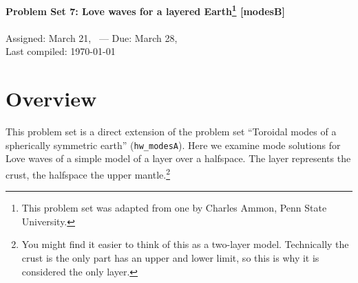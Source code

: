 \documentclass[11pt,titlepage,fleqn]{article}
\begin{document}

\begin{spacing}{1.2}
\centering
{\large \bf Problem Set 7: Love waves for a layered Earth\footnote{This problem set was adapted from one by Charles Ammon, Penn State University.} [modesB]} \\
\cltag\ \\
Assigned: March 21, \cyear\ --- Due: March 28, \cyear\ \\
Last compiled: \today
\end{spacing}


\section*{Overview}

This problem set is a direct extension of the problem set ``Toroidal modes of a spherically symmetric earth'' (\verb+hw_modesA+). Here we examine mode solutions for Love waves of a simple model of a layer over a halfspace. The layer represents the crust, the halfspace the upper mantle.\footnote{You might find it easier to think of this as a two-layer model. Technically the crust is the only part has an upper and lower limit, so this is why it is considered the only layer.}
\end{document}
